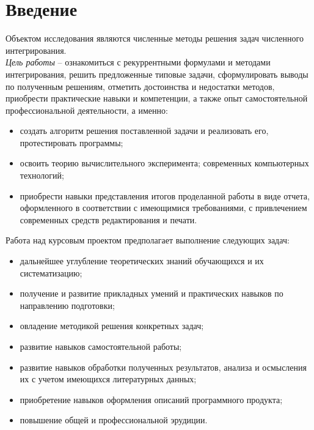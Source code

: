 \documentclass[14pt, titlepage, a4paper]{extarticle} %
\begin{document}

	\tableofcontents
	\pagebreak
	
	
	\section*{Введение}
	
	Объектом исследования являются численные методы решения задач численного интегрирования.\\
	\textit{Цель работы} – ознакомиться с рекуррентными формулами и методами интегрирования, решить предложенные типовые задачи, сформулировать выводы по полученным решениям, отметить достоинства и недостатки методов, приобрести практические навыки и компетенции, а также опыт самостоятельной профессиональной деятельности, а именно:
	\begin{itemize}
		\item создать алгоритм решения поставленной задачи и реализовать его, протестировать программы;
		\item освоить теорию вычислительного эксперимента; современных компьютерных технологий; 
		\item приобрести навыки представления итогов проделанной работы в виде отчета, оформленного в соответствии с имеющимися требованиями, с привлечением современных средств редактирования и печати.	
	\end{itemize}
	Работа над курсовым проектом предполагает выполнение следующих задач:
	\begin{itemize}
		\item дальнейшее углубление теоретических знаний обучающихся и их систематизацию;
		\item получение и развитие прикладных умений и практических навыков по направлению подготовки;
		\item овладение методикой решения конкретных задач;
		\item развитие навыков самостоятельной работы;
		\item развитие навыков обработки полученных результатов, анализа и осмысления их с учетом имеющихся литературных данных;
		\item приобретение навыков оформления описаний программного продукта;
		\item повышение общей и профессиональной эрудиции.
	\end{itemize}
\end{document}
